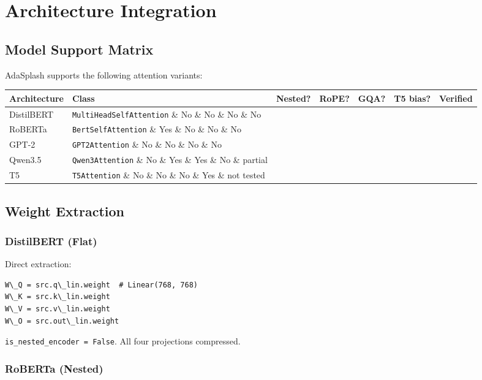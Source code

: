 
\section{Architecture Integration}

\subsection{Model Support Matrix}

AdaSplash supports the following attention variants:

\begin{table}[H]
\centering
\small
\begin{tabular}{lllllll}
\toprule
\textbf{Architecture} & \textbf{Class} & \textbf{Nested?} & \textbf{RoPE?} & \textbf{GQA?} & \textbf{T5 bias?} & \textbf{Verified} \\
\midrule
DistilBERT & \texttt{MultiHeadSelfAttention} \& No \& No \& No \& No &  \\
RoBERTa & \texttt{BertSelfAttention} \& Yes \& No \& No \& No &  \\
GPT-2 & \texttt{GPT2Attention} \& No \& No \& No \& No &  \\
Qwen3.5 & \texttt{Qwen3Attention} \& No \& Yes \& Yes \& No \& partial \\
T5 & \texttt{T5Attention} \& No \& No \& No \& Yes \& not tested \\
\bottomrule
\end{tabular}
\end{table}

\subsection{Weight Extraction}

\subsubsection{DistilBERT (Flat)}

Direct extraction:

\begin{lstlisting}
W\_Q = src.q\_lin.weight  # Linear(768, 768)
W\_K = src.k\_lin.weight
W\_V = src.v\_lin.weight
W\_O = src.out\_lin.weight
\end{lstlisting}

\texttt{is\_nested\_encoder = False}. All four projections compressed.

\subsubsection{RoBERTa (Nested)}

